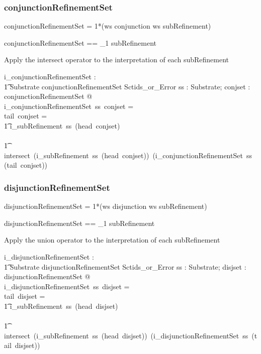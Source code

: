 \documentclass{article}
\def\bnf#1{{\scriptsize {{#1}} }}
\begin{document}
\subsubsection{conjunctionRefinementSet}
\begin{framed}
\noindent
\bnf{conjunctionRefinementSet = 1*(ws conjunction ws subRefinement)}
\end{framed}

\begin{zed}
conjunctionRefinementSet == \seq_1 subRefinement 
\end{zed}

Apply the intersect operator to the interpretation of each  subRefinement

\begin{gendef}
    i\_conjunctionRefinementSet : \\
\t1 Substrate \fun conjunctionRefinementSet \fun Sctids\_or\_Error
\where
   \forall ss : Substrate;  conjset : conjunctionRefinementSet @ \\
   i\_conjunctionRefinementSet~ss~conjset = ~ \\
   \IF tail~conjset = \langle \rangle \\
\t1 \THEN i\_subRefinement~ss~(head~conjset) \\
\ELSE \\
\t1 intersect~(i\_subRefinement~ss~(head~conjset))~(i\_conjunctionRefinementSet~ss~(tail~conjset))
\end{gendef}

\subsubsection{disjunctionRefinementSet}
\begin{framed}
\noindent
\bnf{disjunctionRefinementSet = 1*(ws disjunction ws subRefinement)}
\end{framed}

\begin{zed}
disjunctionRefinementSet == \seq_1 subRefinement 
\end{zed}

Apply the union operator to the interpretation of each  subRefinement

\begin{gendef}
    i\_disjunctionRefinementSet : \\
\t1 Substrate \fun disjunctionRefinementSet \fun Sctids\_or\_Error
\where
   \forall ss : Substrate;  disjset : disjunctionRefinementSet @ \\
   i\_disjunctionRefinementSet~ss~disjset = ~ \\
   \IF tail~disjset =  \langle \rangle \\
\t1 \THEN i\_subRefinement~ss~(head~disjset) \\
\ELSE \\
\t1 intersect~(i\_subRefinement~ss~(head~disjset))~(i\_disjunctionRefinementSet~ss~(tail~disjset))
\end{gendef}
\end{document}
